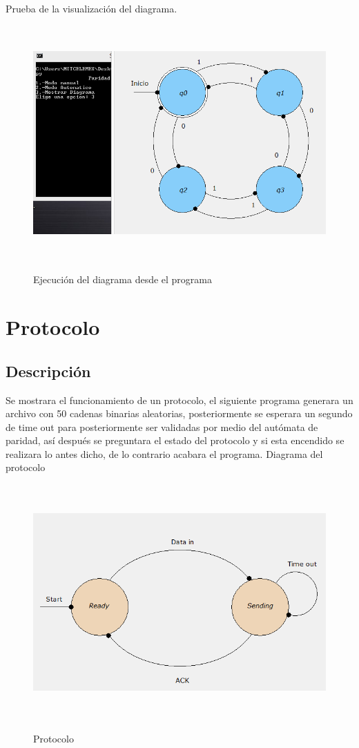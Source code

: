 \documentclass[12pt,letterpaper]{article}
\begin{document}
Prueba de la visualizaci\'on del diagrama.\\
\begin{figure}[H]
\includegraphics[width=\textwidth, height=9cm]{diagramaParidad.png}
\label{fig:Diaparidad}
\caption{Ejecuci\'on del diagrama desde el programa}
\end{figure}
\newpage
\section{Protocolo}
\subsection{Descripci\'on}
Se mostrara el funcionamiento de un protocolo, el siguiente programa generara un archivo con 50 cadenas binarias aleatorias, posteriormente se esperara un segundo de time out para posteriormente ser validadas por medio del aut\'omata de paridad, as\'i despu\'es se preguntara el estado del protocolo y si esta encendido se realizara lo antes dicho, de lo contrario acabara el programa.
Diagrama del protocolo\\
\begin{figure}[H]
\includegraphics[width=\textwidth, height=9cm]{diagramaProtocolo.png}
\label{fig:protocolo}
\caption{Protocolo}
\end{figure}
\end{document}
